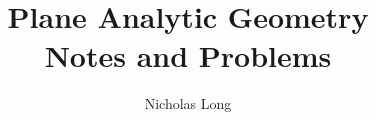 


%
\InstructorVersion
%

\newcommand\bq{\begin{question}}
\newcommand\eq{\end{question}}
\newcommand\be{\begin{enumerate}}
\newcommand\ee{\end{enumerate}}
\renewcommand{\labelenumi}{\alph{enumi})}



\large
\frontmatter
\title{Plane Analytic Geometry \\ Notes and Problems}
\author{Nicholas Long}
\maketitle
\tableofcontents


